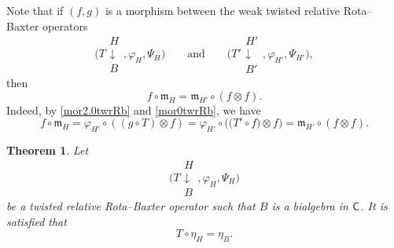 \documentclass[10pt,a4paper]{amsart}
\numberwithin{equation}{section}
\newtheorem{Theorem}{Theorem}[section]
\begin{document}
\begin{Remark}
Note that if $(f,g)$ is a morphism between the weak twisted relative Rota--Baxter operators
\[
\Biggl(T\begin{array}{c}H\\\downarrow\\B\end{array},\varphi_{H},\Psi_{H}\Biggl) \qquad \text{and}\qquad \Biggl(T'\begin{array}{c}H'\\\downarrow\\B'\end{array},\varphi_{H'},\Psi_{H'}\Biggr),
\]
then \begin{equation}\label{mor2twrRb}
f\circ\mathfrak{m}_{H}=\mathfrak{m}_{H'}\circ(f\otimes f).
\end{equation}
Indeed, by \eqref{mor2.0twrRb} and \eqref{mor0twrRb}, we have
\[f\circ\mathfrak{m}_{H}=\varphi_{H'}\circ((g\circ T)\otimes f)=\varphi_{H'}\circ\bigl(\bigl(T'\circ f\bigr)\otimes f\bigr)=\mathfrak{m}_{H'}\circ(f\otimes f).
\]
\end{Remark}
\begin{Theorem}%
Let
\[
\Biggl(T\begin{array}{c}H\\\downarrow\\B\end{array},\varphi_{H},\Psi_{H}\Biggl)
\]
 be a twisted relative Rota--Baxter operator such that $B$ is a bialgebra in ${\sf C}$. It is satisfied that
\begin{equation}\label{etaT}
T\circ\eta_{H}=\eta_{B}.
\end{equation}
\end{Theorem}
\end{document}

